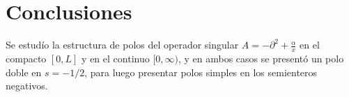 \chapter{Conclusiones}

Se estudío la estructura de polos del operador singular $A = - \partial ^2 + \frac{\alpha}{x} $ en el compacto $[0,L]$ y en el continuo $[0, \infty)$, y en ambos casos se presentó un polo doble en $s= -1/2$, para luego presentar polos simples en los semienteros negativos.